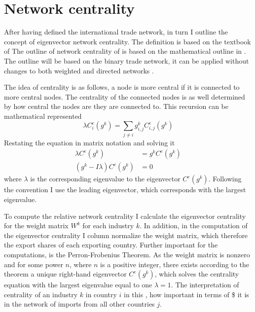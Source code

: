  \section{Network centrality}
After having defined the international trade network, in turn I outline the concept of eigenvector network centrality. The definition is based on the textbook of \textcite{jackson2010}
The outline of  network centrality of  \textcite{jackson2010}  is based on the mathematical outline in \textcite{Bonacich77}. The outline will be based on the binary trade network, it can be applied without changes to both weighted and directed networks \parencite{jackson2010}.  \par
The idea of centrality is as follows, a node is more central if it is connected to more central nodes. The centrality of the connected nodes is as well determined by how central the nodes are they are connected to. This recursion can be mathematical represented
\[  \lambda C^e_i (g^k) = \sum_{j \neq i}  g^k_{i,j}C^e_{i,j}(g^k)  \]
Restating the equation in matrix notation and solving it
\begin{align*} 
 \lambda C^e (g^k) & =  g^k C^e (g^k) \\
(g^k - I  \lambda) C^e(g^k) & = 0
 \end{align*}
where $ \lambda$ is the corresponding eigenvalue to the eigenvector $C^e(g^k)$.  Following the convention
 I use the leading eigenvector, which corresponds with the largest eigenvalue. \par  
To compute the relative network centrality I calculate the eigenvector centrality for the weight matrix $W^k$ for each industry $k$. 
In addition, in the computation of the eigenvector centrality I column normalize the weight matrix, which therefore  the export shares of each exporting country. Further important for the computations, is the Perron-Frobenius Theorem. As the weight matrix is nonzero and for some power $n$, where $n$ is a positive integer, there exists according to the theorem a unique right-hand eigenvector $C^e(g^k)$, which solves the centrality equation with the largest eigenvalue equal to one $\lambda = 1$.  The interpretation of 
 centrality of an industry $k$ in country $i$ in this , how important in terms of \$ it is in the network of imports from all other countries $j$. 

